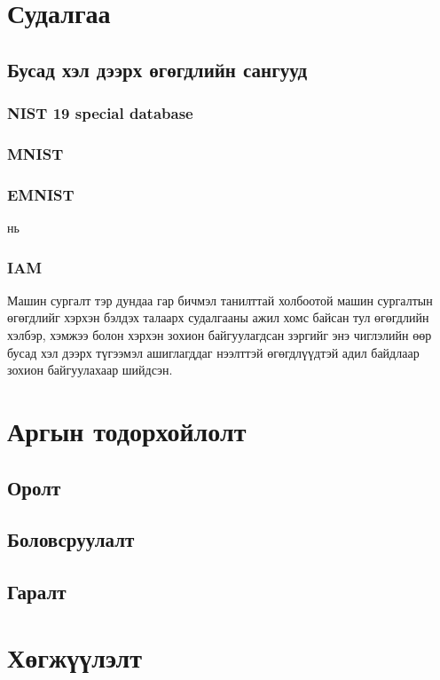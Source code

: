 
\chapter{Судалгаа}

\section{Бусад хэл дээрх өгөгдлийн сангууд}

\subsection{NIST 19 special database}

\subsection{MNIST}

\subsection{EMNIST}

\cite{emnist} нь

\subsection{IAM}

Машин сургалт тэр дундаа гар бичмэл танилттай холбоотой машин сургалтын өгөгдлийг хэрхэн бэлдэх талаарх судалгааны ажил хомс байсан тул өгөгдлийн хэлбэр, хэмжээ болон хэрхэн зохион байгуулагдсан зэргийг энэ чиглэлийн өөр бусад хэл дээрх түгээмэл ашиглагддаг нээлттэй өгөгдлүүдтэй адил байдлаар зохион байгуулахаар шийдсэн.


\chapter{Аргын тодорхойлолт}

\section{Оролт}

\section{Боловсруулалт}

\section{Гаралт}

\chapter{Хөгжүүлэлт}